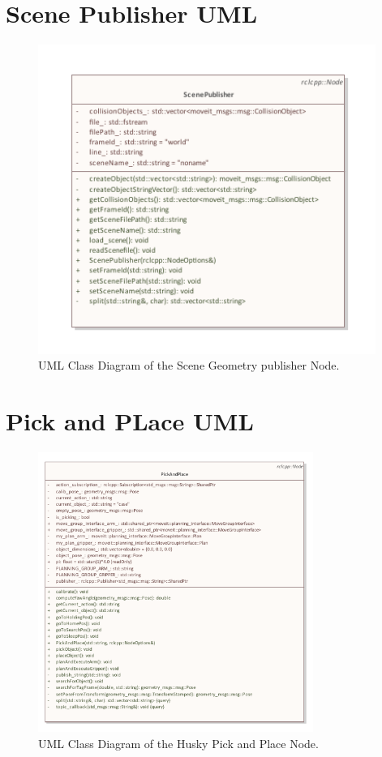 \section{Scene Publisher UML}
\begin{figure}[H]
  \label{A:fig:scenePublisherUML} 
  \centering
  \includegraphics[width = 0.98\textwidth]{Figures/scene_geometry_publisher.pdf}
  \caption{UML Class Diagram of the Scene Geometry publisher Node.}
\end{figure}

\section{Pick and PLace UML}
\begin{figure}[H]
  \centering
  \includegraphics[width = 0.8\textwidth]{Figures/husky_pick_and_place.pdf}
  \caption{UML Class Diagram of the Husky Pick and Place Node.}
  \label{A:fig:PickAndPlaceUML}
\end{figure}

